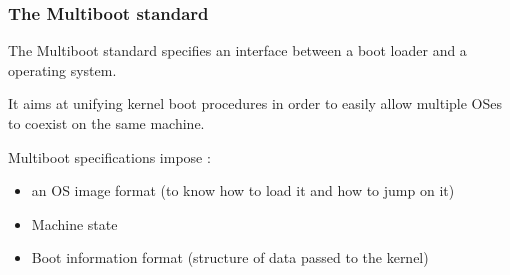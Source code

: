 \begin{frame}
  \frametitle{The Multiboot standard}

  The Multiboot standard specifies an interface between a boot loader and a operating system.

  \-

  It aims at unifying kernel boot procedures in order to easily allow multiple OSes to coexist on the same machine.

  \-

  Multiboot specifications impose :

  \begin{itemize}
  \item an OS image format (to know how to load it and how to jump on it)
  \item Machine state
  \item Boot information format (structure of data passed to the kernel)
  \end{itemize}

\end{frame}


